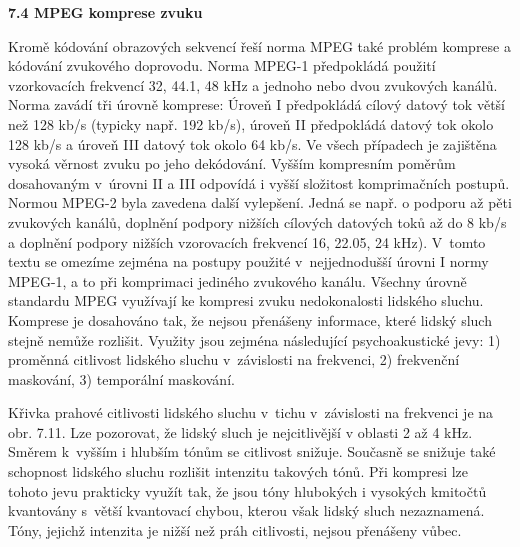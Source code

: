 \noindent 

\noindent 

\noindent 

\noindent 

\noindent 

\noindent 

\noindent 

\noindent 

\noindent 

\noindent \textbf{7.4  MPEG komprese zvuku}

\noindent Kromě kódování obrazových sekvencí řeší norma MPEG také problém komprese a kódování zvukového doprovodu. Norma MPEG-1 předpokládá použití vzorkovacích frekvencí 32, 44.1, 48 kHz a jednoho nebo dvou zvukových kanálů. Norma zavádí tři úrovně komprese: Úroveň I předpokládá cílový datový tok větší než 128 kb/s (typicky např. 192 kb/s), úroveň II předpokládá datový tok okolo 128 kb/s a úroveň III datový tok okolo 64 kb/s. Ve všech případech je zajištěna vysoká věrnost zvuku po jeho dekódování. Vyšším kompresním poměrům dosahovaným v~úrovni II a III odpovídá i vyšší složitost komprimačních postupů. Normou MPEG-2 byla zavedena další vylepšení. Jedná se např. o  podporu až pěti zvukových kanálů, doplnění podpory nižších cílových datových toků až do 8 kb/s a doplnění podpory nižších vzorovacích frekvencí 16, 22.05, 24 kHz). V~tomto textu se omezíme zejména na postupy použité v~nejjednodušší úrovni I normy MPEG-1, a to při komprimaci jediného zvukového kanálu. Všechny úrovně standardu MPEG využívají ke kompresi zvuku nedokonalosti lidského sluchu. Komprese je dosahováno tak, že nejsou přenášeny informace, které lidský sluch stejně nemůže rozlišit. Využity jsou zejména následující psychoakustické jevy: 1) proměnná citlivost lidského sluchu v~závislosti na frekvenci, 2) frekvenční maskování, 3) temporální maskování. 

\noindent 

\noindent 

\noindent Křivka prahové citlivosti lidského sluchu v~tichu v~závislosti na frekvenci je na obr. 7.11. Lze pozorovat, že lidský sluch je nejcitlivější v oblasti 2 až 4 kHz. Směrem k~vyšším i hlubším tónům se citlivost snižuje. Současně se snižuje také schopnost lidského sluchu rozlišit intenzitu takových tónů. Při kompresi lze tohoto jevu prakticky využít tak, že jsou tóny hlubokých i vysokých kmitočtů kvantovány s~větší kvantovací chybou, kterou však lidský sluch nezaznamená. Tóny, jejichž intenzita je nižší než práh citlivosti, nejsou přenášeny vůbec.

